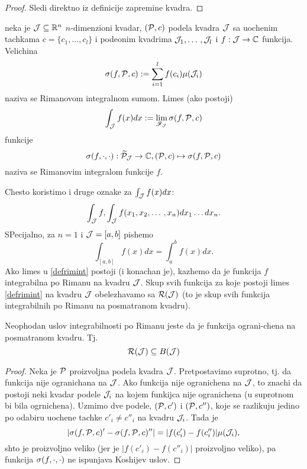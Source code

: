 \documentclass[../main.tex]{subfiles}
\begin{document}
    \begin{proof}
    	Sledi direktno iz definicije zapremine kvadra.
    \end{proof}

    \begin{de}
    	neka je $\mathcal{J} \subseteq \mathbb{R}^n$ $n$-dimenzioni kvadar, $(\mathcal{P},c)$ podela kvadra $\mathcal{J}$ sa uochenim tachkama $ c = \{c_1,\dotso, c_l\}$ i podeonim kvadrima $\mathcal{J}_1,\dotso,\mathcal{J}_l$
	i $f:\mathcal{J} \to \mathbb{C}$ funkcija. Velichina 
	\[ \sigma(f,\mathcal{P},c):= \sum_{i=1}^{l}f(c_i)\mu(\mathcal{J}_i)\]
	naziva se Rimanovom integralnom sumom. Limes (ako postoji) 
	\begin{align}
	    \label{defrimint}
	    \int_{\mathcal{J}} f(x)dx:=\lim_{\mathscr{F}_{\mathcal{J}}} \sigma(f,\mathcal{P},c) 
	\end{align}
	funkcije 
	\[\sigma(f,\mathcal{\cdot},\cdot) : \widetilde{\mathcal{P}}_{\mathcal{J}} \to \mathbb{C}, (\mathcal{P},c) \mapsto \sigma(f,\mathcal{P},c)\]
	naziva se Rimanovim integralom funkcije $f$.
    \end{de}

    Chesto koristimo i druge oznake za  $\int_{\mathcal{J}} f(x)dx$:
    \[\int_{\mathcal{J}} f, \int_{\mathcal{J}} f(x_1,x_2,\dotso, x_n)dx_1\dotso dx_n.\]
    SPecijalno, za $n=1$ i $\mathcal{J}=[a,b]$ pishemo 
    \[\int_{[a,b]}f(x)dx = \int_a^b f(x)dx.\]
    Ako limes u \ref{defrimint} postoji (i konachan je), kazhemo da je funkcija $f$ integrabilna po Rimanu na kvadru $\mathcal{J}$. Skup svih funkcija za koje postoji limes
    \ref{defrimint} na kvadru $\mathcal{J}$ obelezhavamo sa $\mathcal{R}(\mathcal{J})$ (to je skup svih funkcija integrabilnih po Rimanu na posmatranom kvadru).

    \begin{tvr}
    	Neophodan uslov integrabilnosti po Rimanu jeste da je funkcija ograni-chena na posmatranom kvadru. Tj.
	\[\mathcal{R}(\mathcal{J}) \subseteq B(\mathcal{J})\]
    \end{tvr}

    \begin{proof}
    	Neka je $\mathcal{P}$ proizvoljna podela kvadra $\mathcal{J}$. Pretpostavimo suprotno, tj. da funkcija nije ogranichana na $\mathcal{J}$. Ako funkcija nije ogranichena na 
	$\mathcal{J}$, to znachi da postoji neki kvadar podele $\mathcal{J}_i$ na kojem funkijca nije ogranichena (u suprotnom bi bila ogrnichena). Uzmimo dve podele, $(\mathcal{P},c')$ i 
	$(\mathcal{P},c'')$, koje se razlikuju jedino po odabiru uochene tachke $c'_i \neq c''_i$ na kvadru $\mathcal{J}_i$. Tada je 
	\[|\sigma(f,\mathcal{P},c)' - \sigma(f,\mathcal{P},c)''| = |f(c'_i)-f(c''_i)|\mu(\mathcal{J}_i),\]
	shto je proizvoljno veliko (jer je $|f(c'_i)-f(c''_i)|$ proizvoljno veliko), pa funkcija $\sigma(f,\mathcal{\cdot},\cdot)$ ne ispunjava Koshijev uslov.
    \end{proof}
\end{document}
